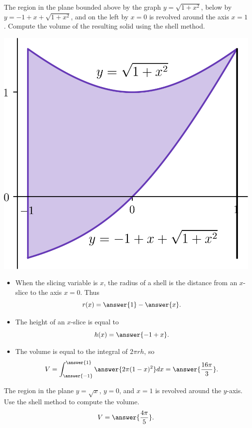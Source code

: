 \documentclass{ximera}
\begin{document}
\begin{exercise}
The region in the plane bounded above by the graph $y = \sqrt{1+x^2}$, below by $y = -1 + x + \sqrt{1+x^2}$, and on the left by $x = 0$ is revolved around the axis $x = 1$. Compute the volume of the resulting solid using the shell method.
\begin{center}
\begin{image}
\includegraphics{shell/shell04.png}
\end{image}
\end{center}
\begin{itemize}
\item When the slicing variable is $x$, the radius of a shell is the  distance from an $x$-slice to the axis $x = 0$. Thus
\[ r(x) = \answer{1} - \answer{x}. \]
\item The height of an $x$-slice is equal to
\[ h(x) = \answer{-1+x}. \]
\item The volume is equal to the integral of $2 \pi r h$, so 
\[ V = \int_{\answer{-1}}^{\answer{1}} \answer{2 \pi (1-x)^2 } dx = \answer{\frac{16\pi}{3}}. \]
\end{itemize}
\end{exercise}

\begin{exercise}
The region in the plane $y = \sqrt{x}$, $y=0$, and $x = 1$ is revolved around the $y$-axis. Use the shell method to compute the volume.
\[ V = \answer{\frac{4 \pi}{5}}. \]
\end{exercise}
\end{document}
